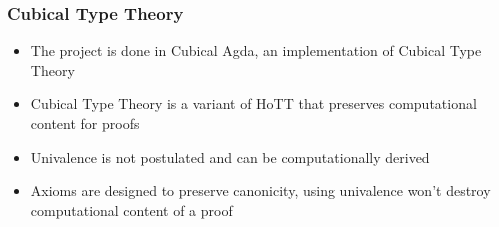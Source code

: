 \documentclass{beamer}
\begin{document}
\begin{frame}
\frametitle{Cubical Type Theory}

\begin{itemize}

  \item The project is done in Cubical Agda, an implementation of Cubical Type Theory
  \item Cubical Type Theory is a variant of HoTT that preserves computational content for proofs
  \item Univalence is not postulated and can be computationally derived
  \item Axioms are designed to preserve canonicity, using univalence won't destroy computational content of a proof

\end{itemize}


\end{frame}
\end{document}
